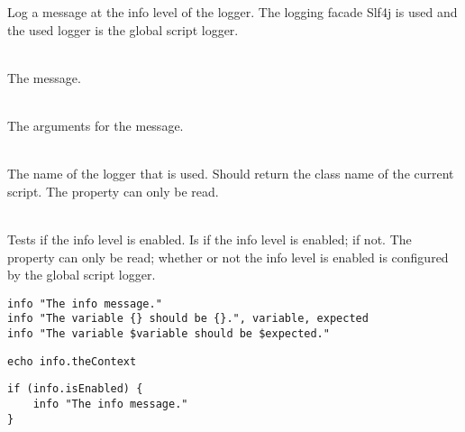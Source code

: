%


Log a message at the info level of the logger.
The logging facade Slf4j\cite{slf4j13} is used and the used logger is
the global script logger.

\begin{asparadesc}
%
\item[\code{message}] \hfill \\
The message.
%
\item[\code{arguments...}] \hfill \\
The arguments for the message.
%
\item[\code{theContext}] \hfill \\
The name of the logger that is used. Should return the class name of the current
script. The property can only be read.
%
\item[\code{isEnabled}] \hfill \\
Tests if the info level is enabled. Is  if the info level is enabled;
 if not.  The property can only be read; whether or not the info
level is enabled is configured by the global script logger.
%
\end{asparadesc}

\begin{lstlisting}[style=Groovybash, label={lst:example_info1}, title={%
Outputs a info logging message with arguments.}]
info "The info message."
info "The variable {} should be {}.", variable, expected
info "The variable $variable should be $expected."
\end{lstlisting}

\begin{lstlisting}[style=Groovybash, label={lst:example_info2}, title={%
Prints the name of the current logger.}]
echo info.theContext
\end{lstlisting}

\begin{lstlisting}[style=Groovybash, label={lst:example_info3}, title={%
Tests if the info level is enabled.}]
if (info.isEnabled) {
    info "The info message."
}
\end{lstlisting}

